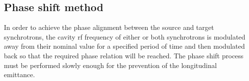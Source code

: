 %
%
%
%

\subsection{Phase shift method}

In order to achieve the phase alignment between the source and target synchrotrons, the cavity rf frequency of either or both synchrotrons is modulated away from their nominal value for a specified period of time and then modulated back so that the required phase relation will be reached. The phase shift process must be performed slowly enough for the prevention of the longitudinal emittance.  



